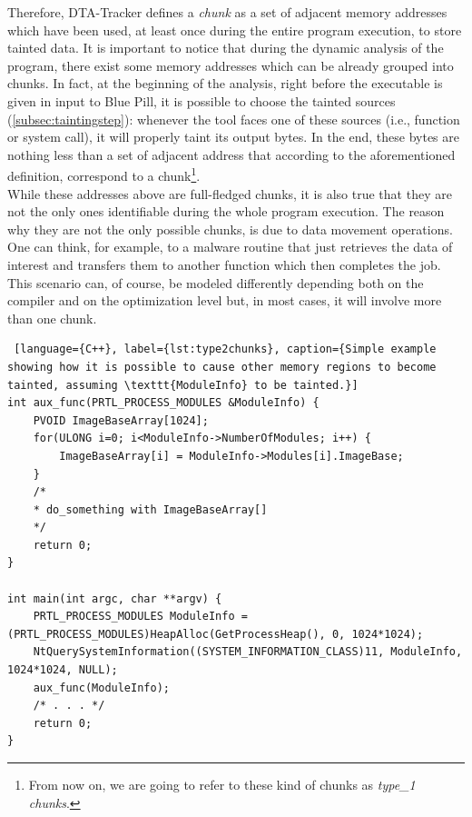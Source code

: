 \documentclass[LaM,binding=0.6cm]{sapthesis}
\begin{document}
Therefore, DTA-Tracker defines a \textit{chunk} as a set of adjacent memory addresses which have been used, at least once during the entire program execution, to store tainted data. It is important to notice that during the dynamic analysis of the program, there exist some memory addresses which can be already grouped into chunks. In fact, at the beginning of the analysis, right before the executable is given in input to Blue Pill, it is possible to choose the tainted sources (\autoref{subsec:taintingstep}): whenever the tool faces one of these sources (i.e., function or system call), it will properly taint its output bytes. In the end, these bytes are nothing less than a set of adjacent address that according to the aforementioned definition, correspond to a chunk\footnote{From now on, we are going to refer to these kind of chunks as \textit{type\_1 chunks}.}.\\
While these addresses above are full-fledged chunks, it is also true that they are not the only ones identifiable during the whole program execution. The reason why they are not the only possible chunks, is due to data movement operations. One can think, for example, to a malware routine that just retrieves the data of interest and transfers them to another function which then completes the job. This scenario can, of course, be modeled differently depending both on the compiler and on the optimization level but, in most cases, it will involve more than one chunk.
\newpage
\begin{lstlisting} [language={C++}, label={lst:type2chunks}, caption={Simple example showing how it is possible to cause other memory regions to become tainted, assuming \texttt{ModuleInfo} to be tainted.}]
int aux_func(PRTL_PROCESS_MODULES &ModuleInfo) {
	PVOID ImageBaseArray[1024];
	for(ULONG i=0; i<ModuleInfo->NumberOfModules; i++) {
		ImageBaseArray[i] = ModuleInfo->Modules[i].ImageBase;
	}
	/*
	* do_something with ImageBaseArray[]
	*/
	return 0;
}

int main(int argc, char **argv) {
	PRTL_PROCESS_MODULES ModuleInfo = (PRTL_PROCESS_MODULES)HeapAlloc(GetProcessHeap(), 0, 1024*1024);
	NtQuerySystemInformation((SYSTEM_INFORMATION_CLASS)11, ModuleInfo, 1024*1024, NULL);
	aux_func(ModuleInfo);
	/* . . . */
	return 0;
}

\end{lstlisting}
\end{document}
